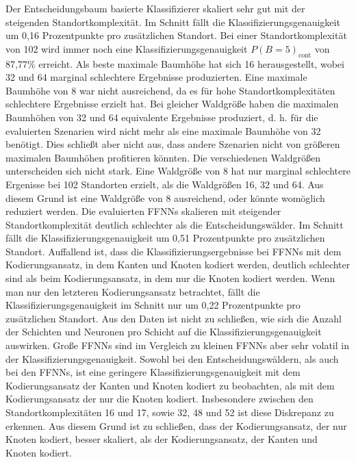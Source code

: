 \newline
\newline
Der Entscheidungsbaum basierte Klassifizierer skaliert sehr gut mit der steigenden Standortkomplexität.
Im Schnitt fällt die Klassifizierungsgenauigkeit um 0,16 Prozentpunkte pro zusätzlichen Standort.
Bei einer Standortkomplexität von 102 wird immer noch eine Klassifizierungsgenauigkeit $P(B=5)_{\text{cont}}$ von 87,77\% erreicht.
Als beste maximale Baumhöhe hat sich 16 herausgestellt, wobei 32 und 64 marginal schlechtere Ergebnisse produzierten.
Eine maximale Baumhöhe von 8 war nicht ausreichend, da es für hohe Standortkomplexitäten schlechtere Ergebnisse erzielt hat.
Bei gleicher Waldgröße haben die maximalen Baumhöhen von 32 und 64 equivalente Ergebnisse produziert,
d. h. für die evaluierten Szenarien wird nicht mehr als eine maximale Baumhöhe von 32 benötigt.
Dies schließt aber nicht aus, dass andere Szenarien nicht von größeren maximalen Baumhöhen profitieren könnten.
Die verschiedenen Waldgrößen unterscheiden sich nicht stark.
Eine Waldgröße von 8 hat nur marginal schlechtere Ergenisse bei 102 Standorten erzielt, als die Waldgrößen 16, 32 und 64.
Aus diesem Grund ist eine Waldgröße von 8 ausreichend, oder könnte womöglich reduziert werden.
\newpage
Die evaluierten FFNNs skalieren mit steigender Standortkomplexität deutlich schlechter als die Entscheidungswälder.
Im Schnitt fällt die Klassifizierungsgenauigkeit um 0,51 Prozentpunkte pro zusätzlichen Standort.
Auffallend ist, dass die Klassifizierungsergebnisse bei FFNNs mit dem Kodierungsansatz, in dem Kanten und Knoten kodiert werden,
deutlich schlechter sind als beim Kodierungsansatz, in dem nur die Knoten kodiert werden.
Wenn man nur den letzteren Kodierungsansatz betrachtet, fällt die Klassifizierungsgenauigkeit im Schnitt nur um 0,22 Prozentpunkte pro zusätzlichen Standort.
Aus den Daten ist nicht zu schließen, wie sich die Anzahl der Schichten und Neuronen pro Schicht auf die Klassifizierungsgenauigkeit auswirken.
Große FFNNs sind im Vergleich zu kleinen FFNNs aber sehr volatil in der Klassifizierungsgenauigkeit.
\newline
\newline
Sowohl bei den Entscheidungswäldern, als auch bei den FFNNs, ist eine geringere Klassifizierungsgenauigkeit mit dem Kodierungsansatz der Kanten und Knoten kodiert
zu beobachten, als mit dem Kodierungsansatz der nur die Knoten kodiert.
Insbesondere zwischen den Standortkomplexitäten 16 und 17, sowie 32, 48 und 52 ist diese Diskrepanz zu erkennen.
Aus diesem Grund ist zu schließen, dass der Kodierungsansatz, der nur Knoten kodiert, besser skaliert, als der Kodierungsansatz, der Kanten und Knoten kodiert.